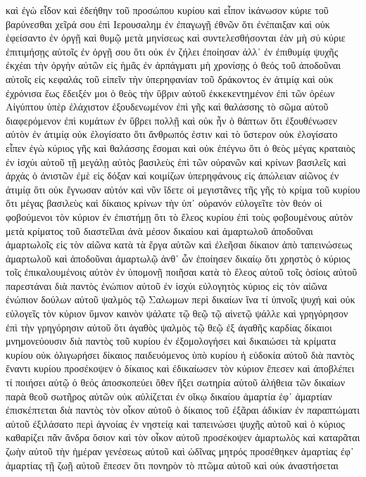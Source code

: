 καὶ ἐγὼ εἶδον καὶ ἐδεήθην τοῦ προσώπου κυρίου καὶ εἶπον ἱκάνωσον κύριε τοῦ βαρύνεσθαι χεῖρά σου ἐπὶ Ιερουσαλημ ἐν ἐπαγωγῇ ἐθνῶν
ὅτι ἐνέπαιξαν καὶ οὐκ ἐφείσαντο ἐν ὀργῇ καὶ θυμῷ μετὰ μηνίσεως καὶ συντελεσθήσονται ἐὰν μὴ σύ κύριε ἐπιτιμήσῃς αὐτοῖς ἐν ὀργῇ σου
ὅτι οὐκ ἐν ζήλει ἐποίησαν ἀλλ᾽ ἐν ἐπιθυμίᾳ ψυχῆς ἐκχέαι τὴν ὀργὴν αὐτῶν εἰς ἡμᾶς ἐν ἁρπάγματι
μὴ χρονίσῃς ὁ θεός τοῦ ἀποδοῦναι αὐτοῖς εἰς κεφαλάς τοῦ εἰπεῖν τὴν ὑπερηφανίαν τοῦ δράκοντος ἐν ἀτιμίᾳ
καὶ οὐκ ἐχρόνισα ἕως ἔδειξέν μοι ὁ θεὸς τὴν ὕβριν αὐτοῦ ἐκκεκεντημένον ἐπὶ τῶν ὀρέων Αἰγύπτου ὑπὲρ ἐλάχιστον ἐξουδενωμένον ἐπὶ γῆς καὶ θαλάσσης
τὸ σῶμα αὐτοῦ διαφερόμενον ἐπὶ κυμάτων ἐν ὕβρει πολλῇ καὶ οὐκ ἦν ὁ θάπτων ὅτι ἐξουθένωσεν αὐτὸν ἐν ἀτιμίᾳ
οὐκ ἐλογίσατο ὅτι ἄνθρωπός ἐστιν καὶ τὸ ὕστερον οὐκ ἐλογίσατο
εἶπεν ἐγὼ κύριος γῆς καὶ θαλάσσης ἔσομαι καὶ οὐκ ἐπέγνω ὅτι ὁ θεὸς μέγας κραταιὸς ἐν ἰσχύι αὐτοῦ τῇ μεγάλῃ
αὐτὸς βασιλεὺς ἐπὶ τῶν οὐρανῶν καὶ κρίνων βασιλεῖς καὶ ἀρχάς
ὁ ἀνιστῶν ἐμὲ εἰς δόξαν καὶ κοιμίζων ὑπερηφάνους εἰς ἀπώλειαν αἰῶνος ἐν ἀτιμίᾳ ὅτι οὐκ ἔγνωσαν αὐτόν
καὶ νῦν ἴδετε οἱ μεγιστᾶνες τῆς γῆς τὸ κρίμα τοῦ κυρίου ὅτι μέγας βασιλεὺς καὶ δίκαιος κρίνων τὴν ὑπ᾽ οὐρανόν
εὐλογεῖτε τὸν θεόν οἱ φοβούμενοι τὸν κύριον ἐν ἐπιστήμῃ ὅτι τὸ ἔλεος κυρίου ἐπὶ τοὺς φοβουμένους αὐτὸν μετὰ κρίματος
τοῦ διαστεῖλαι ἀνὰ μέσον δικαίου καὶ ἁμαρτωλοῦ ἀποδοῦναι ἁμαρτωλοῖς εἰς τὸν αἰῶνα κατὰ τὰ ἔργα αὐτῶν
καὶ ἐλεῆσαι δίκαιον ἀπὸ ταπεινώσεως ἁμαρτωλοῦ καὶ ἀποδοῦναι ἁμαρτωλῷ ἀνθ᾽ ὧν ἐποίησεν δικαίῳ
ὅτι χρηστὸς ὁ κύριος τοῖς ἐπικαλουμένοις αὐτὸν ἐν ὑπομονῇ ποιῆσαι κατὰ τὸ ἔλεος αὐτοῦ τοῖς ὁσίοις αὐτοῦ παρεστάναι διὰ παντὸς ἐνώπιον αὐτοῦ ἐν ἰσχύι
εὐλογητὸς κύριος εἰς τὸν αἰῶνα ἐνώπιον δούλων αὐτοῦ
ψαλμὸς τῷ Σαλωμων περὶ δικαίων
ἵνα τί ὑπνοῖς ψυχή καὶ οὐκ εὐλογεῖς τὸν κύριον ὕμνον καινὸν ψάλατε τῷ θεῷ τῷ αἰνετῷ
ψάλλε καὶ γρηγόρησον ἐπὶ τὴν γρηγόρησιν αὐτοῦ ὅτι ἀγαθὸς ψαλμὸς τῷ θεῷ ἐξ ἀγαθῆς καρδίας
δίκαιοι μνημονεύουσιν διὰ παντὸς τοῦ κυρίου ἐν ἐξομολογήσει καὶ δικαιώσει τὰ κρίματα κυρίου
οὐκ ὀλιγωρήσει δίκαιος παιδευόμενος ὑπὸ κυρίου ἡ εὐδοκία αὐτοῦ διὰ παντὸς ἔναντι κυρίου
προσέκοψεν ὁ δίκαιος καὶ ἐδικαίωσεν τὸν κύριον ἔπεσεν καὶ ἀποβλέπει τί ποιήσει αὐτῷ ὁ θεός ἀποσκοπεύει ὅθεν ἥξει σωτηρία αὐτοῦ
ἀλήθεια τῶν δικαίων παρὰ θεοῦ σωτῆρος αὐτῶν οὐκ αὐλίζεται ἐν οἴκῳ δικαίου ἁμαρτία ἐφ᾽ ἁμαρτίαν
ἐπισκέπτεται διὰ παντὸς τὸν οἶκον αὐτοῦ ὁ δίκαιος τοῦ ἐξᾶραι ἀδικίαν ἐν παραπτώματι αὐτοῦ
ἐξιλάσατο περὶ ἀγνοίας ἐν νηστείᾳ καὶ ταπεινώσει ψυχῆς αὐτοῦ καὶ ὁ κύριος καθαρίζει πᾶν ἄνδρα ὅσιον καὶ τὸν οἶκον αὐτοῦ
προσέκοψεν ἁμαρτωλὸς καὶ καταρᾶται ζωὴν αὐτοῦ τὴν ἡμέραν γενέσεως αὐτοῦ καὶ ὠδῖνας μητρός
προσέθηκεν ἁμαρτίας ἐφ᾽ ἁμαρτίας τῇ ζωῇ αὐτοῦ ἔπεσεν ὅτι πονηρὸν τὸ πτῶμα αὐτοῦ καὶ οὐκ ἀναστήσεται
